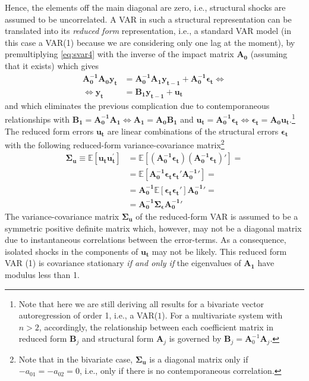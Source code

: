 \documentclass[a4paper,11pt,listof=nochaptergap,oneside,pointednumbers,bibtotoc,bigheadings,liststotoc,hidelinks]{scrbook}
\theoremstyle{mysatz}
\theoremstyle{mydefinition}
\theoremstyle{mytheorem}
\theoremstyle{mybemerkung}
\newcommand{\vect}[1]{\boldsymbol{\mathbf{#1}}}
\begin{document}
Hence, the elements off the main diagonal are zero, i.e., structural shocks are assumed to be uncorrelated. A VAR in such a structural representation can be translated into its \textit{reduced form} representation, i.e., a standard VAR model (in this case a VAR(1) because we are considering only one lag at the moment), by premultiplying \ref{eq:svar4} with the inverse of the impact matrix $\vect{A_0}$ (assuming that it exists) which gives
\begin{equation} \label{eq:svar5}
\begin{split}
	          \vect{A_0^{-1}}\vect{A_0}\vect{y_t} & = \vect{A_0^{-1}}\vect{A_1}\vect{y_{t-1}} + \vect{A_0^{-1}}\vect{\epsilon_t}     \iff \\
	\iff 						\vect{y_t} & = \vect{B_1}\vect{y_{t-1}} + \vect{u_t}
\end{split}								
\end{equation}
and which eliminates the previous complication due to contemporaneous relationships with $\vect{B_1} = \vect{A_0^{-1}}\vect{A_1} \iff \vect{A_1} = \vect{A_0}\vect{B_1}$ and $\vect{u_t} = \vect{A_0^{-1}}\vect{\epsilon_t} \iff \vect{\epsilon_t} = \vect{A_0}\vect{u_t}$.\footnote{Note that here we are still deriving all results for a bivariate vector autoregression of order 1, i.e., a VAR($1$). For a multivariate system with $n>2$, accordingly, the relationship between each coefficient matrix in reduced form $\vect{B}_j$ and structural form $\vect{A}_j$ is governed by $\vect{B}_j = \vect{A}_0^{-1}\vect{A}_j$.}\\
The reduced form errors $\vect{u_t}$ are linear combinations of the structural errors $\vect{\epsilon_t}$ with the following reduced-form variance-covariance matrix\footnote{Note that in the bivariate case, $\vect{\Sigma_u}$ is a diagonal matrix only if $-a_{01} = -a_{02} = 0$, i.e., only if there is no contemporaneous correlation.}
\begin{equation} \label{eq:svar6}
\begin{split}
 		\vect{\Sigma_u} \equiv \mathbb{E}[\vect{u_t}\vect{u_t^'}] & = \mathbb{E}[(\vect{A_0^{-1}}\vect{\epsilon_t}) (\vect{A_0^{-1}}\vect{\epsilon_t})' ] = \\
								& = \mathbb{E}[\vect{A_0^{-1}}\vect{\epsilon_t} \vect{\epsilon_t}'\vect{A_0^{-1}}'] = \\
								& = \vect{A_0^{-1}}\mathbb{E}[\vect{\epsilon_t} \vect{\epsilon_t}']\vect{A_0^{-1}}' = \\
								& = \vect{A_0^{-1}}\vect{\Sigma_\epsilon}\vect{A_0^{-1}}'
\end{split}								
\end{equation}
The variance-covariance matrix $\vect{\Sigma_u}$ of the reduced-form VAR is assumed to be a symmetric positive definite matrix which, however, may not be a diagonal matrix due to instantaneous correlations between the error-terms. As a consequence, isolated shocks in the components of $\vect{u_t}$ may not be likely. This reduced form VAR (1) is covariance stationary \textit{if and only if} the eigenvalues of $\vect{A_1}$ have modulus less than 1.\\
\end{document}
